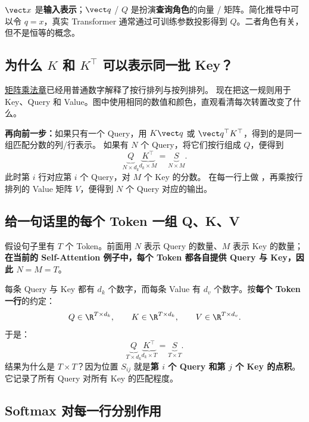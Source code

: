 \begin{conclusion}
$\vect x$ 是\textbf{输入表示}；$\vect q$ / $Q$ 是扮演\textbf{查询角色}的向量 / 矩阵。简化推导中可以令 $q=x$，真实 Transformer 通常通过可训练参数投影得到 $Q$。二者角色有关，但不是恒等的概念。
\end{conclusion}

\subsection{为什么 $K$ 和 $K^\top$ 可以表示同一批 Key？}
\label{sec:key-layout-card}

\hyperref[sec:layout-matrix-card]{矩阵乘法章}已经用普通数字解释了按行排列与按列排列。
现在把这一规则用于 Key、Query 和 Value。图中使用相同的数值和颜色，直观看清每次转置改变了什么。



\textbf{再向前一步：}如果只有一个 Query，用 $K\vect q$ 或
$\vect q^\top K^\top$，得到的是同一组匹配分数的列/行表示。
如果有 $N$ 个 Query，将它们按行组成 $Q$，便得到
\[
\underbrace{Q}_{N\times d_k}
\underbrace{K^\top}_{d_k\times M}
=\underbrace{S}_{N\times M}.
\]
此时第 $i$ 行对应第 $i$ 个 Query，对 $M$ 个 Key 的分数。
在每一行上做 ，再乘按行排列的 Value 矩阵 $V$，便得到
$N$ 个 Query 对应的输出。

\subsection{给一句话里的每个 Token 一组 Q、K、V}

假设句子里有 $T$ 个 Token。前面用 $N$ 表示 Query 的数量、$M$ 表示 Key 的数量；\textbf{在当前的 Self-Attention 例子中，每个 Token 都各自提供 Query 与 Key，因此 $N=M=T$}。

每条 Query 与 Key 都有 $d_k$ 个数字，而每条 Value 有 $d_v$ 个数字。按\textbf{每个 Token 一行}的约定：
\[
Q\in\R^{T\times d_k},\qquad
K\in\R^{T\times d_k},\qquad
V\in\R^{T\times d_v}.
\]
于是：
\[
\underbrace{Q}_{T\times d_k}
\underbrace{K^\top}_{d_k\times T}
=
\underbrace{S}_{T\times T}.
\]
结果为什么是 $T\times T$？因为位置 $S_{ij}$ 就是\textbf{第 $i$ 个 Query 和第 $j$ 个 Key 的点积}。它记录了所有 Query 对所有 Key 的匹配程度。

\subsection{Softmax 对每一行分别作用}


